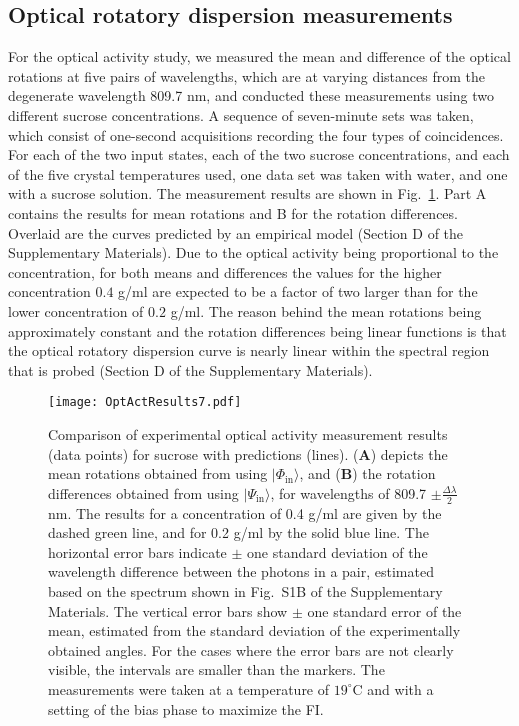 \documentclass[12pt,preprint]{revtex4}
\begin{document}
\subsection*{Optical rotatory dispersion measurements}
For the optical activity study, we measured the mean and difference of the optical rotations at five pairs of wavelengths, which are at varying distances from the degenerate wavelength 809.7 nm, and conducted these measurements using two different sucrose concentrations. A sequence of seven-minute sets was taken, which consist of one-second acquisitions recording the four types of coincidences. For each of the two input states, each of the two sucrose concentrations, and each of the five crystal temperatures used, one data set was taken with water, and one with a sucrose solution. The measurement results are shown in Fig.\ \ref{fig:OptActResults3}. Part A contains the results for mean rotations and B for the rotation differences. Overlaid are the curves predicted by an empirical model (Section D of the Supplementary Materials). Due to the optical activity being proportional to the concentration, for both means and differences the values for the higher concentration $0.4 $ g/ml are expected to be a factor of two larger than for the lower concentration of $0.2$ g/ml. The reason behind the mean rotations being approximately constant and the rotation differences being linear functions is that the optical rotatory dispersion curve is nearly linear within the spectral region that is probed (Section D of the Supplementary Materials). 

\begin{figure}[ht]
	\centering
		\texttt{[image: OptActResults7.pdf]}
	\caption{Comparison of experimental optical activity measurement results (data points) for sucrose with predictions (lines). ({\bf A}) depicts the mean rotations obtained from using $|\Phi_{\mathrm{in}}\rangle$, and ({\bf B}) the rotation differences obtained from using $|\Psi_{\mathrm{in}}\rangle$, for wavelengths of 809.7 $\pm \frac{\Delta \lambda}{2}$ nm. The results for a concentration of 0.4 g/ml are given by the dashed green line, and for 0.2 g/ml by the solid blue line. The horizontal error bars indicate $\pm$ one standard deviation of the wavelength difference between the photons in a pair, estimated based on the spectrum shown in Fig.\ S1B of the Supplementary Materials. The vertical error bars show $\pm$ one standard error of the mean, estimated from the standard deviation of the experimentally obtained angles. For the cases where the error bars are not clearly visible, the intervals are smaller than the markers. The measurements were taken at a temperature of $19^{\circ}$C and with a setting of the bias phase to maximize the FI.}
	\label{fig:OptActResults3}
\end{figure}
\end{document}

